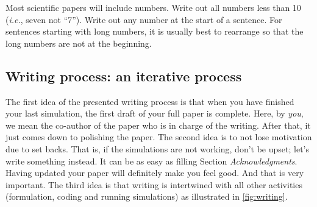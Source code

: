\documentclass[authoryear,12pta4paper,fleqn]{article}
\newcommand{\ie}{\textit{i.e.},\xspace}
\numberwithin{equation}{section}
\theoremstyle{remark}
\begin{document}
Most scientific papers will include numbers. Write out all numbers less than 10 (\ie seven not “7”). Write out any number at the start of a sentence. For sentences starting with long numbers, it is usually best to rearrange so that the long numbers are not at the beginning.





\subsection{Writing process: an iterative process}\label{sec:writing-process}

The  first idea of the presented writing process is that when you have finished your last simulation, the first draft of your full paper is complete. Here, by \textit{you}, we mean the co-author of the paper who is in charge of the writing. After that, it just comes down to polishing the paper. The second idea is to not lose motivation due to set backs. That is, if the simulations are not working, don't be upset; let's write something instead. It can be as easy as filling Section \textit{Acknowledgments}. Having updated your paper will definitely make you feel good. And that is very important. The third idea is that writing is intertwined with all other activities (formulation, coding and running simulations) as illustrated in \cref{fig:writing}. 
\end{document}

